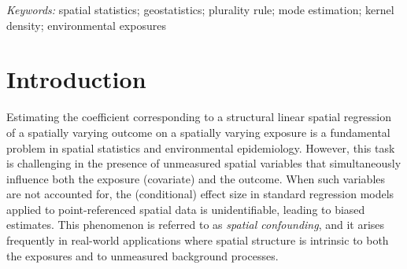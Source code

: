 \documentclass[
  12pt]{article}
\begin{document}
\noindent%
{\it Keywords:} spatial statistics; geostatistics; plurality rule; mode estimation; kernel density; environmental exposures 

\vfill

\newpage
{} %

\section{Introduction}\label{sec-intro}


Estimating the coefficient corresponding to a structural linear spatial regression of a spatially varying outcome on a spatially varying exposure is a fundamental problem in spatial statistics and environmental epidemiology. However, this task is challenging in the presence of unmeasured spatial variables that simultaneously influence both the exposure (covariate) and the outcome. When such variables are not accounted for, the (conditional) effect size in standard regression models applied to point-referenced spatial data is unidentifiable, leading to biased estimates. This phenomenon is referred to as \textit{spatial confounding}, and it arises frequently in real-world applications where spatial structure is intrinsic to both the exposures and to unmeasured background processes.
\end{document}
